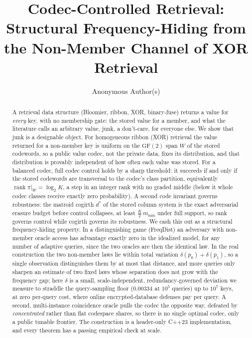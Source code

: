 \documentclass[sigconf,nonacm,anonymous,balance=false]{acmart}
\newcommand{\GF}{\mathrm{GF}(2)}
\DeclareMathOperator{\rank}{rank}
\newcommand{\W}{W}                          %
\newcommand{\proj}{\pi}                     %
\begin{document}
\title{Codec-Controlled Retrieval: Structural Frequency-Hiding from the Non-Member Channel of XOR Retrieval}
\author{Anonymous Author(s)}

\begin{abstract}
A retrieval data structure (Bloomier, ribbon, XOR, binary-fuse) returns a value
for \emph{every} key, with no membership gate: the stored value for a member, and
what the literature calls an arbitrary value, junk, a don't-care, for everyone else.
We show that junk is a designable object. For homogeneous ribbon (XOR) retrieval the
value returned for a non-member key is uniform on the $\GF$ span $\W$ of the stored
codewords, so a public value codec, not the private data, fixes its distribution, and
that distribution is provably independent of how often each value was stored. For a
balanced codec, full codec control holds by a sharp threshold: it succeeds if and only
if the stored codewords are transversal to the codec's class partition, equivalently
$\rank \proj|_{\W} = \log_2 K$, a step in an integer rank with no graded middle (below
it whole codec classes receive exactly zero probability). A second code invariant
governs robustness: the matroid cogirth $d^\ast$ of the stored column system is the
exact adversarial erasure budget before control collapses, at least
$\tfrac{K}{2}\,m_{\min}$ under full support, so rank governs control while cogirth
governs its robustness. We cash this out as a structural frequency-hiding property. In
a distinguishing game (FreqDist) an adversary with non-member oracle access has
advantage exactly zero in the idealized model, for any number of adaptive queries,
since the two oracles are then the identical law. In the real construction the two
non-member laws lie within total variation $\delta(p_0)+\delta(p_1)$, so a single
observation distinguishes them by at most that distance, and more queries only sharpen
an estimate of two fixed laws whose separation does not grow with the frequency gap; here $\delta$
is a small, scale-independent, redundancy-governed deviation we measure to straddle the
query-sampling floor ($0.00334$ at $10^5$ queries) up to $10^7$ keys, at zero per-query
cost, where online encrypted-database defenses pay per query. A second,
multi-instance coincidence oracle pulls the codec the opposite way, defeated by
\emph{concentrated} rather than flat codespace shares, so there is no single optimal
codec, only a public tunable frontier. The construction is a header-only C++23
implementation, and every theorem has a passing empirical check at scale.
\end{abstract}
\end{document}
